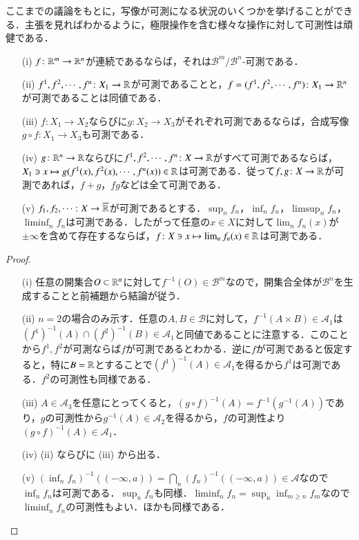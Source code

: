 ここまでの議論をもとに，写像が可測になる状況のいくつかを挙げることができる．主張を見ればわかるように，極限操作を含む様々な操作に対して可測性は頑健である．

\begin{prop}
\leavevmode
\begin{enumerate}
\item[(i)] $f \colon \mathbb{R}^m \to \mathbb{R}^n$が連続であるならば，それは$\mathcal{B}^m/\mathcal{B}^n$-可測である．
\item[(ii)] $f^1, f^2, \cdots, f^n \colon X_1 \to \mathbb{R}$が可測であることと，$f = (f^1, f^2, \cdots, f^n) \colon X_1 \to \mathbb{R}^n$が可測であることは同値である．
\item[(iii)] $f \colon X_1 \to X_2$ならびに$g \colon X_2 \to X_3$がそれぞれ可測であるならば，合成写像$g \circ f \colon X_1 \to X_3$も可測である．
\item[(iv)] $g \colon \mathbb{R}^n \to \mathbb{R}$ならびに$f^1, f^2, \cdots, f^n \colon X \to \mathbb{R}$がすべて可測であるならば，$X_1 \ni x \mapsto g(f^1(x), f^2(x), \cdots, f^n(x)) \in \mathbb{R}$は可測である．従って$f,g \colon X \to \mathbb{R}$が可測であれば，$f+g$，$fg$などは全て可測である．
\item[(v)] $f_1, f_2, \cdots \colon X \to \overline{\mathbb{R}}$が可測であるとする．$\sup_n f_n$，$\inf_n f_n$，$\limsup_n f_n$，$\liminf_n f_n$は可測である．したがって任意の$x \in X$に対して$\lim_n f_n(x)$が$\pm \infty$を含めて存在するならば，$f \colon X \ni x \mapsto \lim_n f_n(x) \in \mathbb{R}$は可測である．
\end{enumerate}
\end{prop}

\begin{proof}
\leavevmode
\begin{enumerate}
\item[(i)] 任意の開集合$O \subset \mathbb{R}^n$に対して$f^{-1}(O) \in \mathcal{B}^m$なので，開集合全体が$\mathcal{B}^n$を生成することと前補題から結論が従う．
\item[(ii)] $n=2$の場合のみ示す．任意の$A,B \in \mathcal{B}$に対して，$f^{-1}(A \times B) \in \mathcal{A}_1$は$\left(f^1\right)^{-1}(A) \cap \left(f^2\right)^{-1}(B) \in \mathcal{A}_1$と同値であることに注意する．このことから$f^1,f^2$が可測ならば$f$が可測であるとわかる．逆に$f$が可測であると仮定すると，特に$B=\mathbb{R}$とすることで$\left(f^1\right)^{-1}(A) \in \mathcal{A}_1$を得るから$f^1$は可測である．$f^2$の可測性も同様である．
\item[(iii)] $A \in \mathcal{A}_3$を任意にとってくると，$(g\circ f)^{-1}(A) = f^{-1}(g^{-1}(A))$であり，$g$の可測性から$g^{-1}(A) \in \mathcal{A}_2$を得るから，$f$の可測性より$(g\circ f)^{-1}(A) \in \mathcal{A}_1$．
\item[(iv)] (ii) ならびに (iii) から出る．
\item[(v)] $(\inf_n f_n)^{-1}((-\infty, a)) = \bigcap_n (f_n)^{-1} ((-\infty, a)) \in \mathcal{A}$なので$\inf_n f_n$は可測である．$\sup_n f_n$も同様．$\liminf_n f_n = \sup_n \inf_{m \geq n} f_m$なので$\liminf_n f_n$の可測性もよい．ほかも同様である．
\end{enumerate}
\end{proof}

